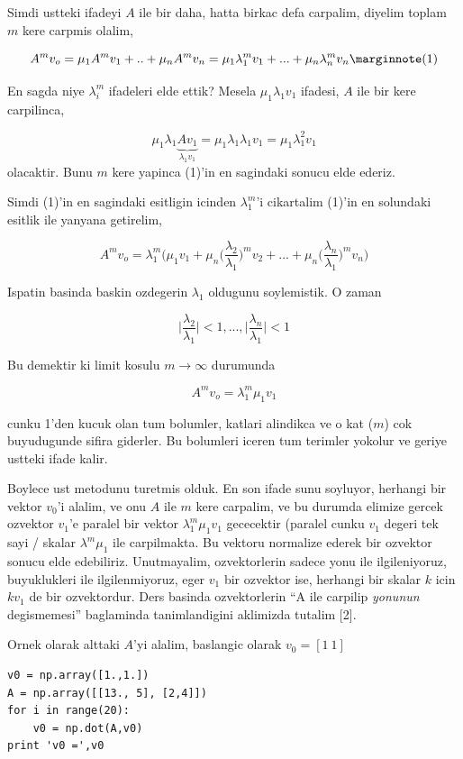 \documentclass[12pt,fleqn]{article}\usepackage{../common}
\begin{document}
Simdi ustteki ifadeyi $A$ ile bir daha, hatta birkac defa carpalim, diyelim
toplam $m$ kere carpmis olalim,


$$ A^m v_o = \mu_1 A^m v_1 + .. + \mu_n A^m v_n =
\mu_1\lambda_1^mv_1 + ... + \mu_n\lambda_n^mv_n
\mlabel{1}
$$

En sagda niye $\lambda_i^m$ ifadeleri elde ettik? Mesela $\mu_1\lambda_1v_1$ ifadesi, $A$ ile bir kere carpilinca,

$$ \mu_1\lambda_1\underbrace{Av_1}_{\lambda_1v_1} =
\mu_1\lambda_1\lambda_1v_1 = 
\mu_1\lambda_1^2v_1 
  $$
olacaktir. Bunu $m$ kere yapinca (1)'in en sagindaki sonucu elde ederiz. 

Simdi (1)'in en sagindaki esitligin icinden $\lambda_1^m$'i cikartalim
(1)'in en solundaki esitlik ile yanyana getirelim,

$$ A^m v_o = 
\lambda_1^m \bigg(  
\mu_1v_1 
+ \mu_n \bigg(\frac{\lambda_2}{\lambda_1}\bigg)^m v_2
+ ... 
+ \mu_n \bigg(\frac{\lambda_n}{\lambda_1}\bigg)^m v_n
\bigg)
$$

Ispatin basinda baskin ozdegerin $\lambda_1$ oldugunu soylemistik. O zaman 

$$ 
\bigg| \frac{\lambda_2}{\lambda_1} \bigg| < 1, ..., 
\bigg| \frac{\lambda_n}{\lambda_1} \bigg| < 1
 $$

Bu demektir ki limit kosulu $m \to \infty$ durumunda

$$ A^m v_o = \lambda_1^m  \mu_1v_1 
$$

cunku 1'den kucuk olan tum bolumler, katlari alindikca ve o kat ($m$) cok
buyudugunde sifira giderler. Bu bolumleri iceren tum terimler yokolur ve
geriye ustteki ifade kalir. 

Boylece ust metodunu turetmis olduk. En son ifade sunu soyluyor, herhangi
bir vektor $v_0$'i alalim, ve onu $A$ ile $m$ kere carpalim, ve bu durumda
elimize gercek ozvektor $v_1$'e paralel bir vektor $\lambda_1^m \mu_1v_1$
gececektir (paralel cunku $v_1$ degeri tek sayi / skalar $\lambda^m\mu_1$
ile carpilmakta. Bu vektoru normalize ederek bir ozvektor sonucu elde
edebiliriz. Unutmayalim, ozvektorlerin sadece yonu ile ilgileniyoruz,
buyuklukleri ile ilgilenmiyoruz, eger $v_1$ bir ozvektor ise, herhangi bir
skalar $k$ icin $kv_1$ de bir ozvektordur. Ders basinda ozvektorlerin ``A
ile carpilip {\em yonunun} degismemesi'' baglaminda tanimlandigini
aklimizda tutalim [2].

Ornek olarak alttaki $A$'yi alalim, baslangic olarak $v_0 = [1 \ 1]$

\begin{verbatim}
v0 = np.array([1.,1.])
A = np.array([[13., 5], [2,4]])
for i in range(20): 
    v0 = np.dot(A,v0)
print 'v0 =',v0
\end{verbatim}
\end{document}
